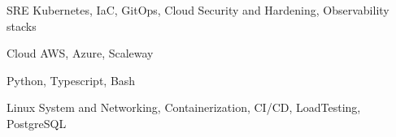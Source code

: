 

\begin{cvskills}

  \cvskill
    {SRE} %
    {Kubernetes, IaC, GitOps, Cloud Security and Hardening, Observability stacks} %

  \cvskill
    {Cloud}
    {AWS, Azure, Scaleway}

  \cvskill
    {} %
    {Python, Typescript, Bash } %

  \cvskill
    {} %
    {Linux System and Networking, Containerization, CI/CD, LoadTesting, PostgreSQL } %

  \cvskill
    {} %
    {} %

\end{cvskills}
